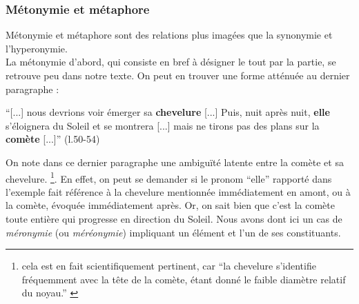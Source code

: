 \documentclass[a4paper,10pt]{article}
\begin{document}
		\subsubsection{Métonymie et métaphore}
			Métonymie et métaphore sont des relations plus imagées que la synonymie et l'hyperonymie.\\
			La métonymie d'abord, qui consiste en bref à désigner le tout par la partie, se retrouve peu dans notre texte. On peut en trouver une forme atténuée au dernier paragraphe :
			\begin{center}
				\footnotesize
				\begin{minipage}{0.7\textwidth}
					``[...] nous devrions voir émerger sa \textbf{chevelure} [...] Puis, nuit après nuit, \textbf{elle} s'éloignera du Soleil et se montrera [...] mais ne tirons pas des plans sur la \textbf{comète} [...]'' (l.50-54)
				\end{minipage}
			\end{center}
			On note dans ce dernier paragraphe une ambiguïté latente entre la comète et sa chevelure. \footnote{cela est en fait scientifiquement pertinent, car ``la chevelure s'identifie fréquemment avec la tête de la comète, étant donné le faible diamètre relatif du noyau.'' \cite{comete}}. En effet, on peut se demander si le pronom ``elle'' rapporté dans l'exemple fait référence à la chevelure mentionnée immédiatement en amont, ou à la comète, évoquée immédiatement après. Or, on sait bien que c'est la comète toute entière qui progresse en direction du Soleil. Nous avons dont ici un cas de \textit{méronymie} (ou \textit{méréonymie}) impliquant un élément et l'un de ses constituants.
		
\end{document}

